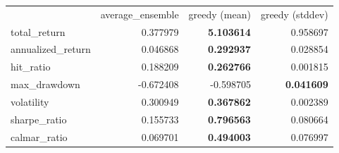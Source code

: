 \begin{tabular}{lrrr}
 & average_ensemble & greedy (mean) & greedy (stddev) \\
total_return & 0.377979 & \bfseries 5.103614 & 0.958697 \\
annualized_return & 0.046868 & \bfseries 0.292937 & 0.028854 \\
hit_ratio & 0.188209 & \bfseries 0.262766 & 0.001815 \\
max_drawdown & -0.672408 & -0.598705 & \bfseries 0.041609 \\
volatility & 0.300949 & \bfseries 0.367862 & 0.002389 \\
sharpe_ratio & 0.155733 & \bfseries 0.796563 & 0.080664 \\
calmar_ratio & 0.069701 & \bfseries 0.494003 & 0.076997 \\
\end{tabular}
